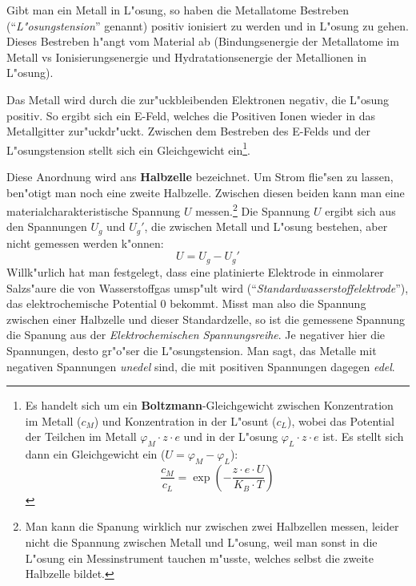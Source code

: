\begin{description}[\setlabelstyle{\bfseries\slshape}]
\item[\index{Galvanisches Element}\textsc{Galvani}sches Element] Gibt
   man ein Metall in L"osung, so haben die Metallatome Bestreben
   ("`\emph{L"osungstension}"' genannt) positiv
   ionisiert zu werden und in L"osung zu gehen. Dieses Bestreben h"angt
   vom Material ab (Bindungsenergie der Metallatome im Metall vs
   Ionisierungsenergie und Hydratationsenergie der Metallionen in
   L"osung).

   Das Metall wird durch die zur"uckbleibenden Elektronen negativ, die
   L"osung positiv. So ergibt sich ein E-Feld, welches die Positiven
   Ionen wieder in das Metallgitter zur"uckdr"uckt. Zwischen dem
   Bestreben des E-Felds und der L"osungstension stellt sich ein
   Gleichgewicht
   ein\footnote{\label{fn_bolzmann_loesungsgleichgewicht}Es handelt
     sich um ein \textbf{Boltzmann}-Gleichgewicht zwischen
     Konzentration im Metall ($c_M$) und Konzentration in der L"osunt
     ($c_L$), wobei das Potential der Teilchen im Metall $\varphi_M
     \cdot z \cdot e$ und in der L"osung $\varphi_L \cdot z \cdot e$
     ist. Es stellt sich dann ein Gleichgewicht ein ($U = \varphi_M -
     \varphi_L$): $$\frac{c_M}{c_L} = \exp \left ( - \frac{z \cdot e
          \cdot U}{K_B \cdot T} \right )$$}.

   Diese Anordnung wird ans \textbf{Halbzelle}
   bezeichnet. Um Strom flie"sen zu lassen, ben"otigt man noch eine
   zweite Halbzelle. Zwischen diesen beiden kann man eine
   materialcharakteristische Spannung $U$ messen.\footnote{Man kann
     die Spanung wirklich nur zwischen zwei Halbzellen messen, leider
     nicht die Spannung zwischen Metall und L"osung, weil man sonst in
     die L"osung ein Messinstrument tauchen m"usste, welches selbst die
     zweite Halbzelle bildet.} Die Spannung $U$ ergibt sich aus den
   Spannungen $U_g$ und $U_g'$, die zwischen Metall und L"osung
   bestehen, aber nicht gemessen werden k"onnen:
   $$U = U_g - U_g'$$
   Willk"urlich hat man festgelegt, dass eine platinierte Elektrode in
   einmolarer Salzs"aure die von Wasserstoffgas umsp"ult wird
   ("`\emph{Standardwasserstoffelektrode}"'),
   das elektrochemische Potential $0$ bekommt. Misst man also die
   Spannung zwischen einer Halbzelle und dieser Standardzelle, so ist
   die gemessene Spannung die Spanung aus der  \emph{Elektrochemischen Spannungsreihe}. Je
   negativer hier die Spannungen, desto gr"o"ser die L"osungstension. Man
   sagt, das Metalle mit negativen Spannungen \emph{unedel} sind, die
   mit positiven Spannungen dagegen \emph{edel}.


\end{description}
